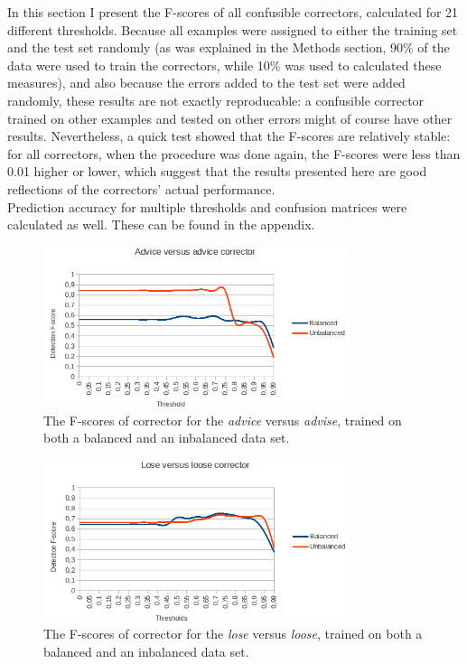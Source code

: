 \documentclass[12pt]{article}
\begin{document}
In this section I present the F-scores of all confusible correctors, calculated for 21 different thresholds. Because all examples were assigned to either the training set and the test set randomly (as was explained in the Methods section, 90\% of the data were used to train the correctors, while 10\% was used to calculated these measures), and also because the errors added to the test set were added randomly, these results are not exactly reproducable: a confusible corrector trained on other examples and tested on other errors might of course have other results. Nevertheless, a quick test showed that the F-scores are relatively stable: for all correctors, when the procedure was done again, the F-scores were less than 0.01 higher or lower, which suggest that the results presented here are good reflections of the correctors' actual performance.\\\indent
Prediction accuracy for multiple thresholds and confusion matrices were calculated as well. These can be found in the appendix.

\begin{figure}[H]
\centering
\includegraphics[width=0.8\textwidth]{fscore_adviceadvise.png}
\caption{The F-scores of corrector for the \emph{advice} versus \emph{advise}, trained on both a balanced and an inbalanced data set.}
\end{figure}

\begin{figure}[H]
\centering
\includegraphics[width=0.8\textwidth]{fscore_loseloose.png}
\caption{The F-scores of corrector for the \emph{lose} versus \emph{loose}, trained on both a balanced and an inbalanced data set.}
\end{figure}
\end{document}
